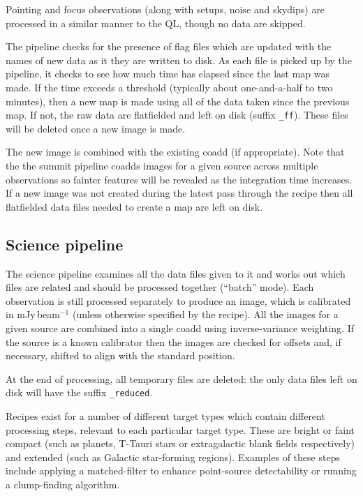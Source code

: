 \documentclass[twoside,11pt]{article}
\renewcommand{\_}{\texttt{\symbol{95}}}
\begin{document}
Pointing and focus observations (along with setups, noise and skydips)
are processed in a similar manner to the QL, though no data are
skipped.

The pipeline checks for the presence of flag files which are updated
with the names of new data as it they are written to disk. As each
file is picked up by the pipeline, it checks to see how much time has
elapsed since the last map was made. If the time exceeds a threshold
(typically about one-and-a-half to two minutes), then a new map is
made using all of the data taken since the previous map. If not, the
raw data are flatfielded and left on disk (suffix \verb+_ff+). These
files will be deleted once a new image is made.

The new image is combined with the existing coadd (if
appropriate). Note that the the summit pipeline coadds images for a
given source across multiple observations so fainter features will be
revealed as the integration time increases. If a new image was not
created during the latest pass through the recipe then all flatfielded
data files needed to create a map are left on disk.

\subsection{Science pipeline}

The science pipeline examines all the data files given to it and works
out which files are related and should be processed together
(``batch'' mode). Each observation is still processed separately to
produce an image, which is calibrated in mJy\,beam$^{-1}$ (unless
otherwise specified by the recipe). All the images for a given source
are combined into a single coadd using inverse-variance weighting. If
the source is a known calibrator then the images are checked for
offsets and, if necessary, shifted to align with the standard
position.

At the end of processing, all temporary files are deleted: the only
data files left on disk will have the suffix \verb+_reduced+.

Recipes exist for a number of different target types which contain
different processing steps, relevant to each particular target
type. These are bright or faint compact (such as planets, T-Tauri
stars or extragalactic blank fields respectively) and extended (such
as Galactic star-forming regions). Examples of these steps include
applying a matched-filter to enhance point-source detectability or
running a clump-finding algorithm.
\end{document}
